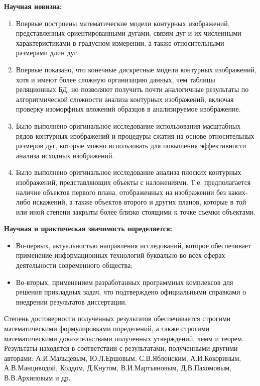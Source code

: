 \textbf{Научная новизна:}
\begin{enumerate}
\item Впервые построены математические модели контурных изображений, представленных ориентированными дугами, связям дуг и их численными характеристиками в градусном измерении,  а также  относительными размерами  длин дуг.  
\item Впервые  показано, что конечные дискретные модели контурных изображений, хотя и имеют более сложную организацию данных, чем  таблицы реляционных БД, но позволяют получить почти аналогичные результаты по алгоритмической сложности  анализа контурных изображений, включая проверку изоморфных вложений образцов в анализируемое изображение.
\item Было выполнено оригинальное исследование использования масштабных рядов контурных изображений и процедуры сжатия на  основе относительных размеров дуг, которые можно использовать для повышения эффективности анализа исходных изображений.
\item Было выполнено оригинальное исследование анализа плоских контурных изображений, представляющих объекты с наложениями. Т.е. предполагается наличие объектов первого плана, отображенных на изображении без каких-либо искажений,  а также объектов второго и других планов, которые в той или иной степени закрыты более близко стоящими к точке съемки объектами.
\end{enumerate}

\noindent
\textbf{Научная и практическая значимость определяется:}
\begin{itemize}
\item Во-первых, актуальностью направления исследований, которое обеспечивает применение информационных технологий буквально во всех сферах деятельности современного общества;
\item Во-вторых, применением разработанных программных комплексов для решения прикладных задач, что подтверждено официальными справками о внедрении результатов диссертации.
\end{itemize}

Степень достоверности полученных результатов обеспечивается строгими математическими формулировками определений, а также строгими математическими доказательствами полученных утверждений, лемм и теорем.
Результаты находятся в соответствии с результатами, полученными другими авторами:  А.И.Мальцевым\cite{D12}, Ю.Л.Ершовым\cite{D12}, С.В.Яблонским\cite{D21}, А.И.Кокориным\cite{D10}, А.В.Манциводой\cite{D13},  Коддом\cite{D25}, Д.Кнутом\cite{D9}, В.И.Мартьяновым\cite{Samara}, Д.В.Пахомовым\cite{D16}, В.В.Архиповым\cite{D15} и др\cite{D1,D2,D3,D11}.

